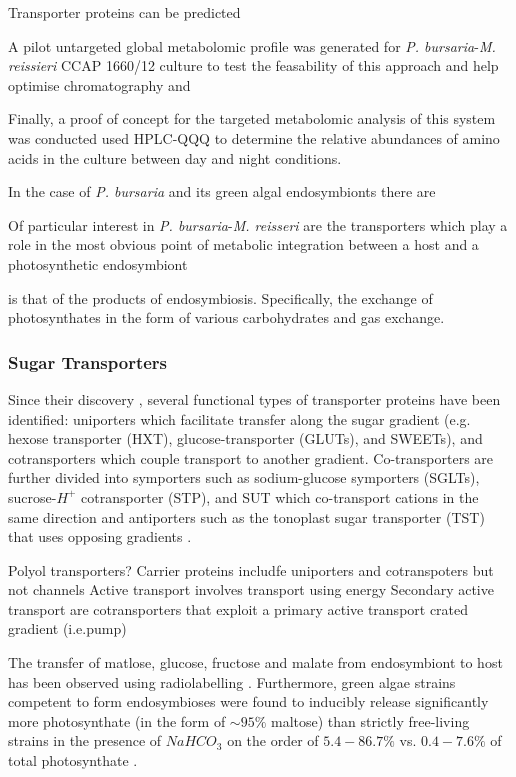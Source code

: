 Transporter proteins can be predicted 






A pilot untargeted global metabolomic profile was generated
for \textit{P. bursaria}-\textit{M. reissieri} CCAP 1660/12 
culture to test the feasability of this approach and help optimise
chromatography and 


Finally, a proof of concept for the targeted metabolomic
analysis of this system was conducted used HPLC-QQQ
to determine the relative abundances of amino acids
in the culture between day and night conditions. 



In the case of \textit{P. bursaria} and its green algal endosymbionts 
there are



Of particular interest in \textit{P. bursaria}-\textit{M. reisseri} 
are the transporters which play a role in the most obvious point of 
metabolic integration between a host
and a photosynthetic endosymbiont 


is that of the products of endosymbiosis. 
Specifically, the exchange of photosynthates in the form of various
carbohydrates and gas exchange. 

\subsubsection{Sugar Transporters}

Since their discovery \citep{Cohen1957}, several functional types of transporter proteins have been identified:
uniporters which facilitate transfer along the sugar gradient (e.g. hexose
transporter (HXT), glucose-transporter (GLUTs), and SWEETs),
and cotransporters which couple transport to another gradient. 
Co-transporters are further divided into symporters such as sodium-glucose symporters (SGLTs), sucrose-\(H^{+}\) 
cotransporter (STP), and SUT which co-transport cations in the same direction and
antiporters such as the tonoplast sugar transporter (TST) that uses opposing
gradients \citep{Chen2015}.


Polyol transporters?
Carrier proteins includfe uniporters and cotranspoters but not channels
Active transport involves transport using energy
Secondary active transport are cotransporters that exploit a primary active transport crated
gradient (i.e.pump)



The transfer of matlose, glucose, fructose and malate from endosymbiont
to host has been observed using radiolabelling 
\citep{Brown1974}.  Furthermore, green algae strains competent to
 form endosymbioses were found to inducibly release significantly
 more photosynthate (in the form of \(\sim 95\%\) maltose) than strictly free-living strains
 in the presence of \(NaHCO_3\) on the order of \(5.4-86.7\%\) vs. \(0.4-7.6\%\)
 of total photosynthate \citep{Muscatine1967a}.

